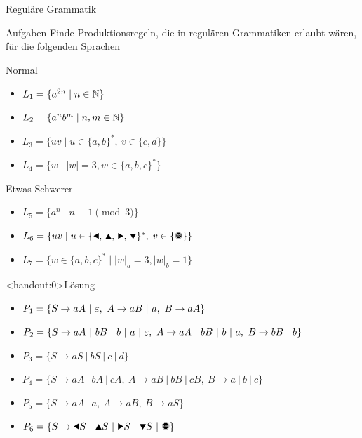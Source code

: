 {
\begin{frame}{Reguläre Grammatik}
    \begin{alertblock}{Aufgaben}
    Finde Produktionsregeln, die in regulären Grammatiken erlaubt wären, für die folgenden Sprachen
    \end{alertblock}
    \begin{block}{Normal}
    \begin{itemize}
        \item $L_1 = \{a^{2n} \mid n\in\mathbb{N}\}$
        \item $L_2 = \{a^nb^m \mid n, m\in\mathbb{N}\}$
        \item $L_3 = \{uv \mid u\in\{a,b\}^\ast,\ v\in\{c,d\}\}$
        \item $L_4 = \{w \mid |w| = 3, w\in \{a,b,c\}^*\}$
    \end{itemize}
    \end{block}
    \begin{block}{Etwas Schwerer}
    \begin{itemize}
        \item $L_5 = \{a^n \mid n \equiv 1 \pmod 3\}$
        \item $L_6 = \{uv\mid u\in\{\text{\Rewind, \MoveUp, \Forward, \MoveDown}\}^\ast,\;v\in\{\text{\Stopsign}\}\}$
        \item $L_7 = \{w \in \{a,b,c\}^* \mid |w|_a = 3, |w|_b = 1\}$
    \end{itemize}
    \end{block}
\end{frame}
}

{
\begin{frame}<handout:0>{Lösung}
    \begin{itemize}
        \item<1-> \alert<1>{$P_1 = \{S \to aA \ |\ \emptyWord,\ A \to aB \ |\ a,\ B \to aA\}$}
        \item<2-> \alert<2>{$P_2 = \{S \to aA \ |\ bB \ |\ b \ |\ a \ |\ \emptyWord,\ A \to aA \ |\ bB \ |\ b \ |\ a ,\ B \to bB \ |\ b\}$}
        \item<3-> \alert<3>{$P_3 = \{S \to aS \ |\ bS \ |\ c \ |\ d\}$}
        \item<4-> \alert<4>{$P_4 = \{S \to aA \ |\ bA \ |\ cA,\ A \to aB \ |\ bB \ |\ cB,\ B \to a \ |\ b \ |\ c\}$}
        \item<5-> \alert<5>{$P_5 = \{S \to aA \ |\ a,\ A \to aB,\ B \to aS\}$}
        \item<6-> \alert<6>{$P_6 = \{S \to \text{\Rewind}S \ |\ \text{\MoveUp}S \ |\ \text{\Forward}S \ |\ \text{\MoveDown}S \ |\ \text{\Stopsign}\}$}
    \end{itemize}
\end{frame}
}

